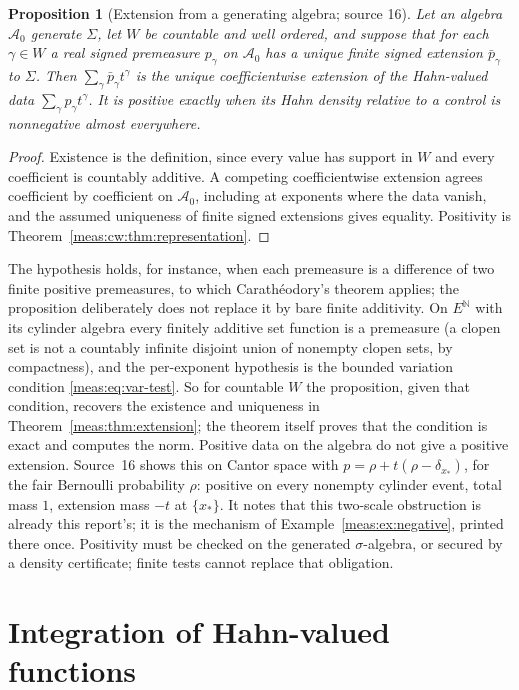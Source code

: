 \documentclass[11pt]{article}
\numberwithin{equation}{section}
\newtheorem{proposition}[theorem]{Proposition}
\theoremstyle{definition}
\theoremstyle{remark}
\newcommand{\N}{\mathbb N}
\begin{document}
\begin{proposition}[Extension from a generating algebra; source 16]
\label{meas:cw:prop:extension}
Let an algebra $\mathcal A_0$ generate $\Sigma$, let $W$ be countable and well
ordered, and suppose that for each $\gamma\in W$ a real signed premeasure
$p_\gamma$ on $\mathcal A_0$ has a unique finite signed extension $\bar p_\gamma$ to
$\Sigma$. Then $\sum_\gamma\bar p_\gamma t^\gamma$ is the unique coefficientwise extension
of the Hahn-valued data $\sum_\gamma p_\gamma t^\gamma$. It is positive exactly when its
Hahn density relative to a control is nonnegative almost everywhere.
\end{proposition}
\begin{proof}
Existence is the definition, since every value has support in $W$ and every
coefficient is countably additive. A competing coefficientwise extension agrees
coefficient by coefficient on $\mathcal A_0$, including at exponents where the
data vanish, and the assumed uniqueness of finite signed extensions gives
equality. Positivity is Theorem~\ref{meas:cw:thm:representation}.
\end{proof}

The hypothesis holds, for instance, when each premeasure is a difference of
two finite positive premeasures, to which Carath\'eodory's theorem applies; the
proposition deliberately does not replace it by bare finite additivity. On
$E^{\N}$ with its cylinder algebra every finitely additive set function is a
premeasure (a clopen set is not a countably infinite disjoint union of nonempty
clopen sets, by compactness), and the per-exponent hypothesis is the bounded
variation condition \eqref{meas:eq:var-test}. So for countable $W$ the
proposition, given that condition, recovers the existence and uniqueness in
Theorem~\ref{meas:thm:extension}; the theorem itself proves that the condition is
exact and computes the norm. Positive data on the algebra do not give a positive extension.
Source~16 shows this on Cantor space with $p=\rho+t(\rho-\delta_{x_*})$, for the
fair Bernoulli probability $\rho$: positive on every nonempty cylinder event,
total mass $1$, extension mass $-t$ at $\{x_*\}$. It notes that this two-scale
obstruction is already this report's; it is the mechanism of
Example~\ref{meas:ex:negative}, printed there once. Positivity must be checked on
the generated $\sigma$-algebra, or secured by a density certificate; finite
tests cannot replace that obligation.

\section{Integration of Hahn-valued functions}\label{meas:cw:sec:integral}
\end{document}
